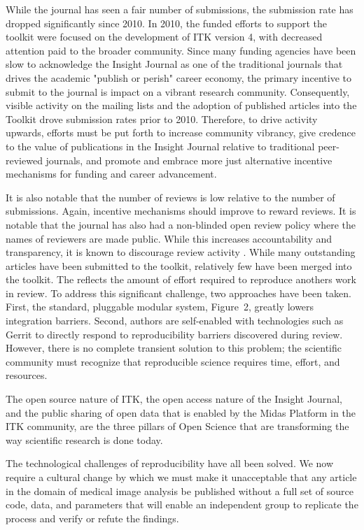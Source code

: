 \documentclass{frontiersENG} %
\begin{document}
While the journal has seen a fair number of submissions, the submission rate
has dropped significantly since 2010. In 2010, the funded efforts to support
the toolkit were focused on the development of ITK version 4, with decreased
attention paid to the broader community.  Since many funding agencies have been
slow to acknowledge the Insight Journal as one of the traditional journals
that drives the academic "publish or perish" career economy, the primary
incentive to submit to the journal is impact on a vibrant research community.
Consequently, visible activity on the mailing lists and the adoption of published
articles into the Toolkit drove submission rates prior to 2010. Therefore, to
drive activity upwards, efforts must be put forth to increase community
vibrancy, give credence to the value of publications in the Insight Journal
relative to traditional peer-reviewed journals, and promote and embrace more
just alternative incentive mechanisms for funding and career advancement.

It is also notable that the number of reviews is low relative to the number of
submissions. Again, incentive mechanisms should improve to reward reviews.  It
is notable that the journal has also had a non-blinded open review policy
where the names of reviewers are made public. While this increases
accountability and transparency, it is known to discourage review activity
\cite{Rooyen1999,Walsh2000}. While many outstanding articles have been
submitted to the toolkit, relatively few have been merged into the toolkit.
The reflects the amount of effort required to reproduce anothers work in
review.  To address this significant challenge, two approaches have been
taken.  First, the standard, pluggable modular system,
Figure~2, greatly lowers integration barriers.
Second, authors are self-enabled with technologies such as Gerrit to directly respond
to reproducibility barriers discovered during review. However, there is no
complete transient solution to this
problem; the scientific community must recognize that reproducible science
requires time, effort, and resources.

The open source nature of ITK, the open access nature of the Insight Journal,
and the public sharing of open data that is enabled by the Midas Platform in
the ITK community, are the three pillars of Open Science that are transforming
the way scientific research is done today.

The technological challenges of reproducibility have all been solved. We now
require a cultural change by which we must make it unacceptable that any
article in the domain of medical image analysis be published without a full
set of source code, data, and parameters that will enable an independent group
to replicate the process and verify or refute the findings.
\end{document}
